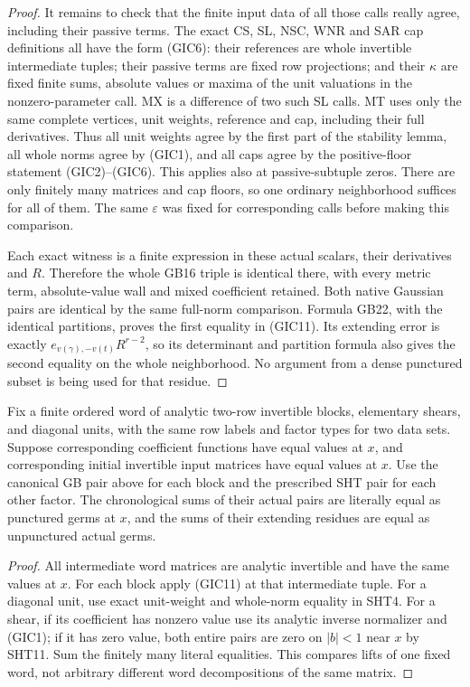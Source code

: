 \begin{proof}
It remains to check that the finite input data of all those
calls really agree, including their passive terms.  The
exact CS, SL, NSC, WNR and SAR cap definitions all have
the form (GIC6): their references are whole invertible
intermediate tuples; their passive terms are fixed row
projections; and their $\kappa$ are fixed finite sums,
absolute values or maxima of the unit valuations in the
nonzero-parameter call.  MX is a difference of two such
SL calls.  MT uses only the same complete vertices,
unit weights, reference and cap, including their full
derivatives.  Thus all unit weights agree by the first
part of the stability lemma, all whole norms agree by
(GIC1), and all caps agree by the positive-floor statement
(GIC2)--(GIC6).  This applies also at passive-subtuple
zeros.  There are only finitely many matrices and cap
floors, so one ordinary neighborhood suffices for all of
them.  The same $\varepsilon$ was fixed for corresponding
calls before making this comparison.

Each exact witness is a finite expression in these actual
scalars, their derivatives and $R$.  Therefore the whole
GB16 triple is identical there, with every metric term,
absolute-value wall and mixed coefficient retained.  Both
native Gaussian pairs are identical by the same full-norm
comparison.  Formula GB22, with the identical partitions,
proves the first equality in (GIC11).
Its extending error is exactly
$e_{v(\gamma),-v(t)}R^{r-2}$, so its determinant and
partition formula also gives the second equality on the
whole neighborhood.  No argument from a dense punctured
subset is being used for that residue.
\end{proof}

\begin{corollary}
Fix a finite ordered word of analytic two-row invertible blocks,
elementary shears, and diagonal units, with the same row labels
and factor types for two data sets.  Suppose corresponding
coefficient functions have equal values at $x$, and corresponding
initial invertible input matrices have equal values at $x$.
Use the canonical GB pair above for each block and the prescribed
SHT pair for each other factor.  The chronological sums of their
actual pairs are literally equal as punctured germs at $x$, and
the sums of their extending residues are equal as unpunctured
actual germs.
\end{corollary}

\begin{proof}
All intermediate word matrices are analytic invertible and have
the same values at $x$.  For each block apply (GIC11) at that
intermediate tuple.  For a diagonal unit, use exact unit-weight
and whole-norm equality in SHT4.  For a shear, if its coefficient
has nonzero value use its analytic inverse normalizer and (GIC1);
if it has zero value, both entire pairs are zero on $|b|<1$
near $x$ by SHT11.  Sum the finitely many literal equalities.
This compares lifts of one fixed word, not arbitrary different
word decompositions of the same matrix.
\end{proof}

